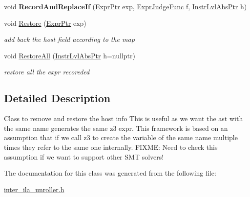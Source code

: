\begin{DoxyCompactItemize}
\mbox{\label{classilang_1_1_host_remove_restore_a158245e0c24fa8bb875e06e968d04bfa}} 
void {\bfseries Record\+And\+Replace\+If} (\mbox{\hyperlink{namespaceilang_a7c4196c72e53ea4df4b7861af7bc3bce}{Expr\+Ptr}} exp, \mbox{\hyperlink{classilang_1_1_host_remove_restore_ad6fe1a90d3e53376a4a4564bb36a4eb5}{Expr\+Judge\+Func}} f, \mbox{\hyperlink{namespaceilang_ad1b30fdf347e493b3937143da05d1a72}{Instr\+Lvl\+Abs\+Ptr}} h)
\item 
\mbox{\label{classilang_1_1_host_remove_restore_a91a45a5e32fd89096d1425d5795b29a2}} 
void \mbox{\hyperlink{classilang_1_1_host_remove_restore_a91a45a5e32fd89096d1425d5795b29a2}{Restore}} (\mbox{\hyperlink{namespaceilang_a7c4196c72e53ea4df4b7861af7bc3bce}{Expr\+Ptr}} exp)
\begin{DoxyCompactList}\small\item\em add back the host field according to the map \end{DoxyCompactList}\item 
\mbox{\label{classilang_1_1_host_remove_restore_ae290c429c0d73072f09eb301f90dd7cc}} 
void \mbox{\hyperlink{classilang_1_1_host_remove_restore_ae290c429c0d73072f09eb301f90dd7cc}{Restore\+All}} (\mbox{\hyperlink{namespaceilang_ad1b30fdf347e493b3937143da05d1a72}{Instr\+Lvl\+Abs\+Ptr}} h=nullptr)
\begin{DoxyCompactList}\small\item\em restore all the expr recoreded \end{DoxyCompactList}\end{DoxyCompactItemize}


\subsection{Detailed Description}
Class to remove and restore the host info This is useful as we want the ast with the same name generates the same z3 expr. This framework is based on an assumption that if we call z3 to create the variable of the same name multiple times they refer to the same one internally. F\+I\+X\+ME\+: Need to check this assumption if we want to support other S\+MT solvers! 

The documentation for this class was generated from the following file\+:\begin{DoxyCompactItemize}
\item 
\mbox{\hyperlink{inter__ila__unroller_8h}{inter\+\_\+ila\+\_\+unroller.\+h}}\end{DoxyCompactItemize}

